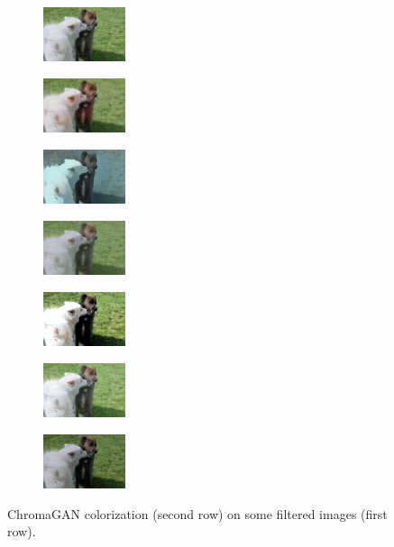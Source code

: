 \begin{figure}[t]
				\begin{subfigure}[b]{0.1\textwidth}
			\centering
			\includegraphics[width=2.4cm]{c - filter.jpeg}

		\end{subfigure}
		\hfill
		\begin{subfigure}[b]{0.1\textwidth}
			\includegraphics[width=2.4cm]{c - filter - blurr.jpeg}
		\end{subfigure}
		\hfill
		\begin{subfigure}[b]{0.1\textwidth}
			\includegraphics[width=2.4cm]{c - filter - cartoon.jpeg}
		
		\end{subfigure}
		\hfill
		\begin{subfigure}[b]{0.1\textwidth}
			\includegraphics[width=2.4cm]{c - filter - man contr (1).jpg}
	
		\end{subfigure}
		\hfill
		\begin{subfigure}[b]{0.1\textwidth}
			\includegraphics[width=2.4cm]{c - filter - man contr (2).jpg}
	
		\end{subfigure}
		\hfill
		\begin{subfigure}[b]{0.1\textwidth}
			\includegraphics[width=2.4cm]{c - filter - lumin (1).jpeg}
	
		\end{subfigure}
		\hfill
		\begin{subfigure}[b]{0.1\textwidth}
			\includegraphics[width=2.4cm]{c - filter - lumin (2).jpeg}
	
		\end{subfigure}
	\caption{{\small ChromaGAN colorization (second row) on some filtered images (first row).}}
	\label{fig:filter}
\end{figure}